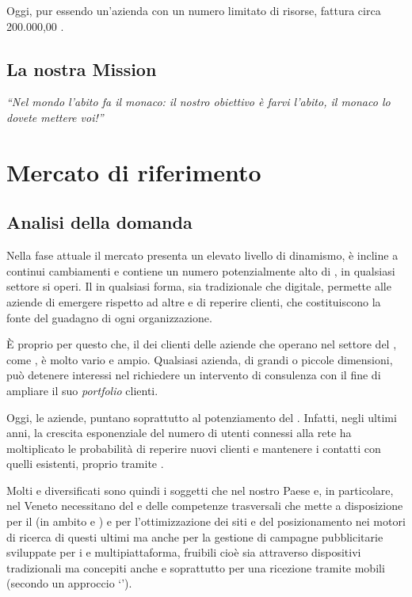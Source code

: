 Oggi, pur essendo un'azienda con un numero limitato di risorse, fattura circa  200.000,00 \text{\euro}.

\section{La nostra Mission}

\textit{``Nel mondo l'abito fa il monaco: il nostro obiettivo è farvi l'abito, il monaco lo dovete mettere voi!''}


\chapter{Mercato di riferimento}
\section{Analisi della domanda}\label{sec:domanda}

Nella fase attuale il mercato presenta un elevato livello di dinamismo, è incline a continui cambiamenti e contiene un numero potenzialmente alto di , in qualsiasi settore si operi. Il \mktg in qualsiasi forma, sia tradizionale che digitale, permette alle aziende di emergere rispetto ad altre e di reperire clienti, che costituiscono la fonte del guadagno di ogni organizzazione.

È  proprio per questo che, il  dei clienti delle aziende che operano nel settore del \mktg, come \customer, è molto vario e ampio. Qualsiasi azienda, di grandi o piccole dimensioni, può detenere interessi nel richiedere un intervento di consulenza \mktg con il fine di ampliare il suo \textit{portfolio} clienti.

Oggi, le aziende, puntano soprattutto al potenziamento del \mktg {}. Infatti, negli ultimi anni, la crescita esponenziale del numero di utenti connessi alla rete ha moltiplicato le probabilità di reperire nuovi clienti e mantenere i contatti con quelli esistenti, proprio tramite .

Molti e diversificati sono quindi i soggetti che nel nostro Paese e, in particolare, nel Veneto necessitano del  e delle competenze trasversali che \customer mette a disposizione per il  \mktg (in ambito  e ) e per l'ottimizzazione dei siti e del posizionamento nei motori di ricerca di questi ultimi ma anche per la gestione di campagne pubblicitarie sviluppate  per i  e multipiattaforma, fruibili cioè sia attraverso dispositivi tradizionali ma concepiti anche e soprattutto per una ricezione tramite  mobili (secondo un approccio `').

